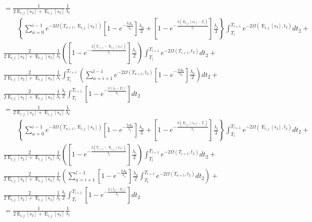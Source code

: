 \documentclass{article}
\DeclareMathOperator{\E}{E}
\begin{document}
\begin{align*}
    &=\frac{1}{2\E_{i,j}[s_2]+\E_{i,j}[s_3]}\frac{1}{\lambda_l}\\
    &\qquad\left\{\sum_{a=0}^{i-1}e^{-3\Omega(T_{a+1},\E_{i,j}[s_3])}
    \left[1-e^{-\frac{3\Delta_a}{\lambda_a}}\right]\frac{\lambda_a}{3}+
    \left[1-e^{-\frac{3\left(\E_{i,j}[s_3]-T_{i}\right)}{\lambda_{i}}}\right]
    \frac{\lambda_{i}}{3}\right\}\int_{T_l}^{T_{l+1}}e^{-2\Omega(\E_{i,j}[s_3],t_2)}dt_2+\\
    &\frac{2}{2\E_{i,j}[s_2]+\E_{i,j}[s_3]}\frac{1}{\lambda_{l}}
    \left(\left[1-e^{-\frac{2\left(T_{i+1}-\E_{i,j}[s_3]\right)}{\lambda_{i}}}\right]
    \frac{\lambda_{i}}{2}\right)\int_{T_l}^{T_{l+1}}e^{-2\Omega(T_{i+1},t_2)}dt_2+\\
    &\frac{2}{2\E_{i,j}[s_2]+\E_{i,j}[s_3]}\frac{1}{\lambda_{l}}
    \int_{T_l}^{T_{l+1}}\left(\sum_{a=i+1}^{l-1}e^{-2\Omega\left(T_{a+1},t_2\right)}
    \left[1-e^{-\frac{2\Delta_a}{\lambda_a}}\right]\frac{\lambda_a}{2}\right)dt_2+\\
    &\frac{2}{2\E_{i,j}[s_2]+\E_{i,j}[s_3]}\frac{1}{\lambda_{l}}
    \frac{\lambda_{l}}{2}\int_{T_l}^{T_{l+1}}\left[1-e^{-\frac{2\left(t_2-T_{l}\right)}{\lambda_{l}}}\right]dt_2\\
    &=\frac{1}{2\E_{i,j}[s_2]+\E_{i,j}[s_3]}\frac{1}{\lambda_l}\\
    &\qquad\left\{\sum_{a=0}^{i-1}e^{-3\Omega(T_{a+1},\E_{i,j}[s_3])}
    \left[1-e^{-\frac{3\Delta_a}{\lambda_a}}\right]\frac{\lambda_a}{3}+
    \left[1-e^{-\frac{3\left(\E_{i,j}[s_3]-T_{i}\right)}{\lambda_{i}}}\right]
    \frac{\lambda_{i}}{3}\right\}\int_{T_l}^{T_{l+1}}e^{-2\Omega(\E_{i,j}[s_3],t_2)}dt_2+\\
    &\frac{2}{2\E_{i,j}[s_2]+\E_{i,j}[s_3]}\frac{1}{\lambda_{l}}
    \left(\left[1-e^{-\frac{2\left(T_{i+1}-\E_{i,j}[s_3]\right)}{\lambda_{i}}}\right]
    \frac{\lambda_{i}}{2}\right)\int_{T_l}^{T_{l+1}}e^{-2\Omega(T_{i+1},t_2)}dt_2+\\
    &\frac{2}{2\E_{i,j}[s_2]+\E_{i,j}[s_3]}\frac{1}{\lambda_{l}}
    \left(\sum_{a=i+1}^{l-1}\left[1-e^{-\frac{2\Delta_a}{\lambda_a}}\right]\frac{\lambda_a}{2}
    \int_{T_l}^{T_{l+1}}e^{-2\Omega\left(T_{a+1},t_2\right)}dt_2\right)+\\
    &\frac{2}{2\E_{i,j}[s_2]+\E_{i,j}[s_3]}\frac{1}{\lambda_{l}}
    \frac{\lambda_{l}}{2}\int_{T_l}^{T_{l+1}}\left[1-e^{-\frac{2\left(t_2-T_{l}\right)}{\lambda_{l}}}\right]dt_2\\[2em]
    &=\frac{1}{2\E_{i,j}[s_2]+\E_{i,j}[s_3]}\frac{1}{\lambda_l}\\

\end{align*}
\end{document}

